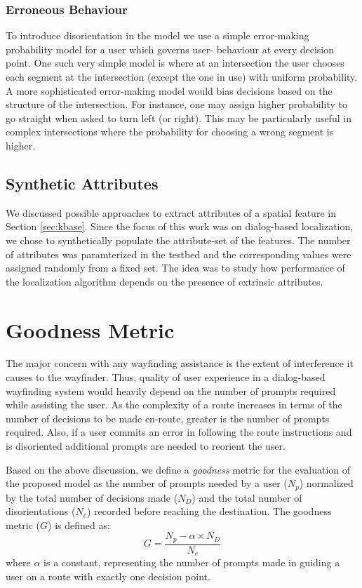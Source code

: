 \documentclass{iitkthesis}
\begin{document}
  \subsubsection*{Erroneous Behaviour}
To introduce disorientation in the model we use 
a simple error-making probability model for a user which governs user-
behaviour at every decision point. One such very simple model is
where at an intersection the user chooses each segment at 
the intersection (except the one in use) with uniform 
probability. A more sophisticated error-making model would bias decisions 
based on the structure of the intersection. For instance, one may assign 
higher probability to go straight when asked to turn left (or right). 
This may be particularly useful in complex intersections where the 
probability for choosing a wrong segment is higher. 
  \subsection{Synthetic Attributes}
We discussed possible approaches to extract attributes of a spatial 
feature in Section \ref{sec:kbase}.  Since the focus of this 
work was on dialog-based localization, we chose to synthetically populate 
the attribute-set of the features. The number of attributes was 
paramterized in the testbed and the corresponding values were assigned 
randomly from a fixed set. The idea was to study how performance of the 
localization algorithm depends on the presence of extrinsic attributes. 
 \section{Goodness Metric}
The major concern with any wayfinding assistance is the extent of 
interference it causes to the wayfinder. Thus, quality of user experience 
in a dialog-based wayfinding system would heavily depend on the 
number of prompts required while assisting the user. As the complexity of 
a route increases in terms of the number of decisions to be made en-route, 
greater is the number of prompts required. Also, if a user 
commits an error in following the route instructions and is disoriented
additional prompts are needed to reorient the user. 

Based on the above discussion, we define a \textit{goodness} metric for the 
evaluation of the proposed model as the number of prompts 
needed by a user ($N_p$) normalized by the total number of decisions 
made ($N_D$) and the total number of disorientations ($N_e$) recorded 
before reaching the destination. The goodness metric ($G$) is defined 
as: 
\[\displaystyle G = \frac{N_p - \alpha \times N_D}{N_e}\]  
where $\alpha$ is a constant, representing the number of prompts made in 
guiding a user on a route with exactly one decision point.
\end{document}
